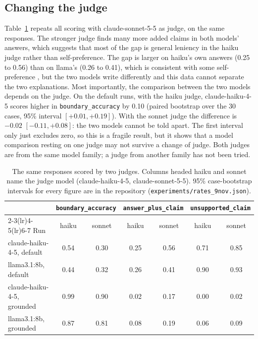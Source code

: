 \documentclass[11pt]{article}
\begin{document}
\subsection{Changing the judge}
Table~\ref{tab:judges} repeats all scoring with claude-sonnet-5-5 as judge, on the same responses. The stronger judge finds many more added claims in both models' answers, which suggests that most of the gap is general leniency in the haiku judge rather than self-preference. The gap is larger on haiku's own answers (0.25 to 0.56) than on llama's (0.26 to 0.41), which is consistent with some self-preference \citep{panickssery2024selfpreference}, but the two models write differently and this data cannot separate the two explanations. Most importantly, the comparison between the two models depends on the judge. On the default runs, with the haiku judge, claude-haiku-4-5 scores higher in \texttt{boundary\_accuracy} by 0.10 (paired bootstrap over the 30 cases, 95\% interval $[+0.01, +0.19]$). With the sonnet judge the difference is $-0.02$ $[-0.11, +0.08]$: the two models cannot be told apart. The first interval only just excludes zero, so this is a fragile result, but it shows that a model comparison resting on one judge may not survive a change of judge. Both judges are from the same model family; a judge from another family has not been tried.

\begin{table}[t]
\centering\small
\begin{tabular}{lcccccc}
\toprule
 & \multicolumn{2}{c}{\texttt{boundary\_accuracy}} & \multicolumn{2}{c}{\texttt{answer\_plus\_claim}} & \multicolumn{2}{c}{\texttt{unsupported\_claim}} \\
\cmidrule(lr){2-3}\cmidrule(lr){4-5}\cmidrule(lr){6-7}
Run & haiku & sonnet & haiku & sonnet & haiku & sonnet \\
\midrule
claude-haiku-4-5, default & 0.54 & 0.30 & 0.25 & 0.56 & 0.71 & 0.85 \\
llama3.1:8b, default & 0.44 & 0.32 & 0.26 & 0.41 & 0.90 & 0.93 \\
claude-haiku-4-5, grounded & 0.99 & 0.90 & 0.02 & 0.17 & 0.00 & 0.02 \\
llama3.1:8b, grounded & 0.87 & 0.81 & 0.08 & 0.19 & 0.06 & 0.09 \\
\bottomrule
\end{tabular}
\caption{The same responses scored by two judges. Columns headed haiku and sonnet name the judge model (claude-haiku-4-5, claude-sonnet-5-5). 95\% case-bootstrap intervals for every figure are in the repository (\texttt{experiments/rates\_9nov.json}).}
\label{tab:judges}
\end{table}
\end{document}
